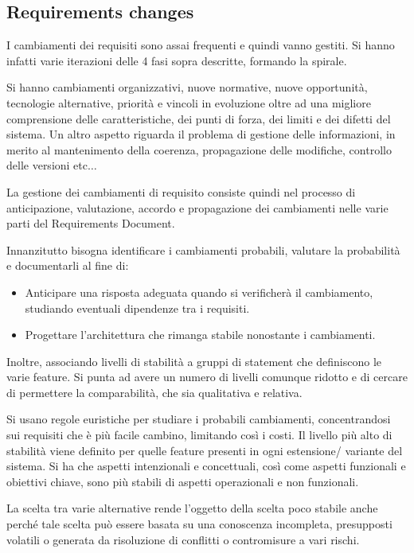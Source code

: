 \subsection{Requirements changes}
I cambiamenti dei requisiti sono assai frequenti e quindi vanno gestiti. Si hanno
infatti varie iterazioni delle 4 fasi sopra descritte, formando la spirale.

Si hanno cambiamenti organizzativi, nuove normative, nuove opportunità,
tecnologie alternative, priorità e vincoli in evoluzione oltre ad una migliore
comprensione delle caratteristiche, dei punti di forza, dei limiti e dei difetti
del sistema. Un altro aspetto riguarda il problema di gestione delle informazioni,
in merito al mantenimento della coerenza, propagazione delle modifiche, controllo
delle versioni etc$\dots$

La gestione dei cambiamenti di requisito consiste quindi nel processo di
anticipazione, valutazione, accordo e propagazione dei cambiamenti nelle varie
parti del Requirements Document.

Innanzitutto bisogna identificare i cambiamenti probabili, valutare la probabilità
e documentarli al fine di:
\begin{itemize}
      \item Anticipare una risposta adeguata quando si verificherà il cambiamento,
            studiando eventuali dipendenze tra i requisiti.
      \item Progettare l'architettura che rimanga stabile nonostante i cambiamenti.
\end{itemize}
Inoltre, associando livelli di stabilità a gruppi di statement che definiscono le
varie feature. Si punta ad avere un numero di livelli comunque ridotto e di
cercare di permettere la comparabilità, che sia qualitativa e relativa.

Si usano regole euristiche per studiare i probabili cambiamenti, concentrandosi
sui requisiti che è più facile cambino, limitando così i costi. Il livello più
alto di stabilità viene definito per quelle feature presenti in ogni estensione/
variante del sistema. Si ha che aspetti intenzionali e concettuali, così come
aspetti funzionali e obiettivi chiave, sono più stabili di aspetti operazionali
e non funzionali.

La scelta tra varie alternative rende l'oggetto della scelta poco stabile anche
perché tale scelta può essere basata su una conoscenza incompleta, presupposti
volatili o generata da risoluzione di conflitti o contromisure a vari rischi.

